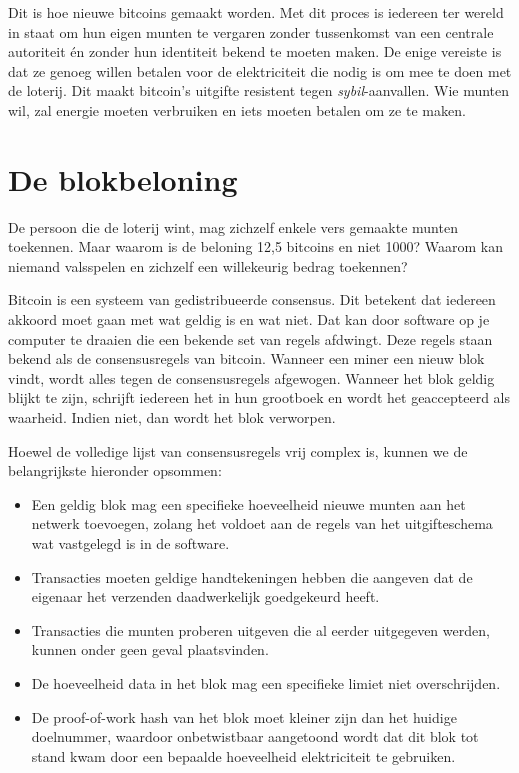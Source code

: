 \documentclass[smalldemyvopaper,11pt,twoside,onecolumn,openright,extrafontsizes]{memoir}
\begin{document}
Dit is hoe nieuwe bitcoins \textquotedbl{}gemaakt\textquotedbl{} worden. Met dit proces is iedereen ter wereld in staat om hun eigen munten te vergaren zonder tussenkomst van een centrale autoriteit én zonder hun identiteit bekend te moeten maken. De enige vereiste is dat ze genoeg willen betalen voor de elektriciteit die nodig is om mee te doen met de loterij. Dit maakt bitcoin’s uitgifte resistent tegen \textit{sybil}-aanvallen. Wie munten wil, zal energie moeten verbruiken en iets moeten betalen om ze te maken.

\section{De blokbeloning}
De persoon die de loterij wint, mag zichzelf enkele vers gemaakte munten toekennen. Maar waarom is de beloning 12,5 bitcoins en niet 1000? Waarom kan niemand valsspelen en zichzelf een willekeurig bedrag toekennen?

Bitcoin is een systeem van gedistribueerde consensus. Dit betekent dat iedereen akkoord moet gaan met wat geldig is en wat niet. Dat kan door software op je computer te draaien die een bekende set van regels afdwingt. Deze regels staan bekend als de consensusregels van bitcoin. Wanneer een miner een nieuw blok vindt, wordt alles tegen de consensusregels afgewogen. Wanneer het blok geldig blijkt te zijn, schrijft iedereen het in hun grootboek en wordt het geaccepteerd als waarheid. Indien niet, dan wordt het blok verworpen.

Hoewel de volledige lijst van consensusregels vrij complex is, kunnen we de belangrijkste hieronder opsommen:

\begin{itemize}
    \item Een geldig blok mag een specifieke hoeveelheid nieuwe munten aan het netwerk toevoegen, zolang het voldoet aan de regels van het uitgifteschema wat vastgelegd is in de software.
    \item Transacties moeten geldige handtekeningen hebben die aangeven dat de eigenaar het verzenden daadwerkelijk goedgekeurd heeft.
    \item Transacties die munten proberen uitgeven die al eerder uitgegeven werden, kunnen onder geen geval plaatsvinden.
    \item De hoeveelheid data in het blok mag een specifieke limiet niet overschrijden.
    \item De proof-of-work hash van het blok moet kleiner zijn dan het huidige doelnummer, waardoor onbetwistbaar aangetoond wordt dat dit blok tot stand kwam door een bepaalde hoeveelheid elektriciteit te gebruiken.
\end{itemize}
\end{document}
